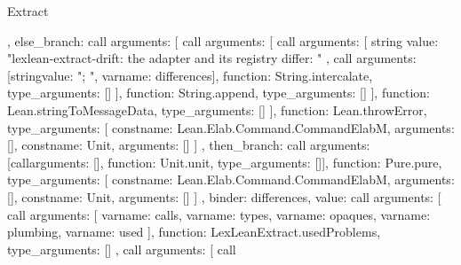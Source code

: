 \begin{lexlean}{Extract}
\begin{toolingmodule}
{{{{{{{{{{                        },
                        else_branch: call{
                          arguments: [
                            call{
                              arguments: [
                                call{
                                  arguments: [
                                    string{
                                      value: "lexlean-extract-drift: the adapter and its registry differ: "
                                    },
                                    call{
                                      arguments: [string{value: "; "}, var{name: differences}],
                                      function: String.intercalate,
                                      type_arguments: []
                                    }
                                  ],
                                  function: String.append,
                                  type_arguments: []
                                }
                              ],
                              function: Lean.stringToMessageData,
                              type_arguments: []
                            }
                          ],
                          function: Lean.throwError,
                          type_arguments: [
                            const{name: Lean.Elab.Command.CommandElabM, arguments: []},
                            const{name: Unit, arguments: []}
                          ]
                        },
                        then_branch: call{
                          arguments: [call{arguments: [], function: Unit.unit, type_arguments: []}],
                          function: Pure.pure,
                          type_arguments: [
                            const{name: Lean.Elab.Command.CommandElabM, arguments: []},
                            const{name: Unit, arguments: []}
                          ]
                        }
                      },
                      binder: differences,
                      value: call{
                        arguments: [
                          call{
                            arguments: [
                              var{name: calls},
                              var{name: types},
                              var{name: opaques},
                              var{name: plumbing},
                              var{name: used}
                            ],
                            function: LexLeanExtract.usedProblems,
                            type_arguments: []
                          },
                          call{
                            arguments: [
                              call{
}}}}}}}}}}}
\end{toolingmodule}
\end{lexlean}
